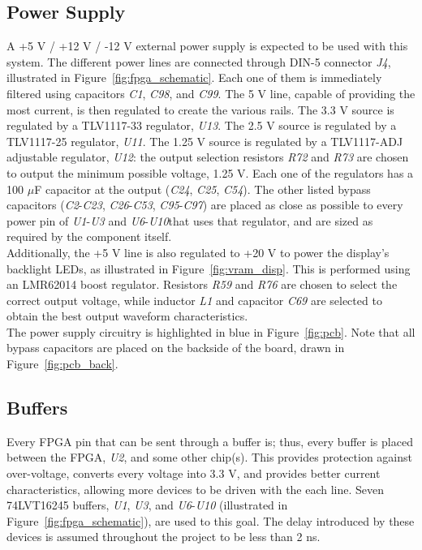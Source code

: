 \documentclass[titlepage]{scrartcl}
\begin{document}
	\subsection{Power Supply}
	A +5 V / +12 V / -12 V external power supply is expected to be used with this system. The different power lines are connected through DIN-5 connector \textit{J4}, illustrated in Figure~\ref{fig:fpga_schematic}. Each one of them is immediately filtered using capacitors \textit{C1}, \textit{C98}, and \textit{C99}. The 5 V line, capable of providing the most current, is then regulated to create the various rails. The 3.3 V source is regulated by a TLV1117-33 regulator, \textit{U13}. The 2.5 V source is regulated by a TLV1117-25 regulator, \textit{U11}. The 1.25 V source is regulated by a TLV1117-ADJ adjustable regulator, \textit{U12}: the output selection resistors \textit{R72} and \textit{R73} are chosen to output the minimum possible voltage, 1.25 V. Each one of the regulators has a 100 $\mu$F capacitor at the output (\textit{C24}, \textit{C25}, \textit{C54}). The other listed bypass capacitors (\textit{C2}-\textit{C23}, \textit{C26}-\textit{C53}, \textit{C95}-\textit{C97}) are placed as close as possible to every power pin of \textit{U1}-\textit{U3} and \textit{U6}-\textit{U10}that uses that regulator, and are sized as required by the component itself.\\

	Additionally, the +5 V line is also regulated to +20 V to power the display's backlight LEDs, as illustrated in Figure~\ref{fig:vram_disp}. This is performed using an LMR62014 boost regulator. Resistors \textit{R59} and \textit{R76} are chosen to select the correct output voltage, while inductor \textit{L1} and capacitor \textit{C69} are selected to obtain the best output waveform characteristics.\\

	The power supply circuitry is highlighted in blue in Figure~\ref{fig:pcb}. Note that all bypass capacitors are placed on the backside of the board, drawn in Figure~\ref{fig:pcb_back}.\\
	
	\clearpage

	\subsection{Buffers}
	Every FPGA pin that can be sent through a buffer is; thus, every buffer is placed between the FPGA, \textit{U2}, and some other chip(s). This provides protection against over-voltage, converts every voltage into 3.3 V, and provides better current characteristics, allowing more devices to be driven with the each line. Seven 74LVT16245 buffers, \textit{U1}, \textit{U3}, and \textit{U6}-\textit{U10} (illustrated in Figure~\ref{fig:fpga_schematic}), are used to this goal. The delay introduced by these devices is assumed throughout the project to be less than 2 ns.\\
\end{document}
